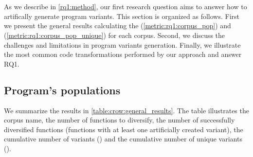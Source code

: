 
\section{\rqone}
\label{results:rq1}


\newcommand{\rossetapopulationunique}{2678}
\newcommand{\rossetapopulation}{809900}
\newcommand{\diversifiedsodium}{85}
\newcommand{\diversifiedqrcode}{32}
\newcommand{\libsodiumpopulation}{4272}
\newcommand{\libsodiumpopulationunique}{3805}
\newcommand{\qrpopulation}{6369}
\newcommand{\qrpopulationunique}{3314}


\newcommand{\allmewediversified}{\diversifiedsodium + \diversifiedqrcode}
\newcommand{\allmewepopulation}{\libpopulation + \qrpopulation}

As we describe in \autoref{rq1:method}, our first research question aims to answer how to artifically generate \wasm program variants. 
This section is organized as follows. First we present the general results calculating the \emph{\corpuspopulationsizename}(\autoref{metric:rq1:corpus_pop}) and \emph{\corpusuniquepopulationsizename}(\autoref{metric:rq1:corpus_pop_unique}) for each corpus. 
Second, we discuss the challenges and limitations in program variants generation. Finally, we illustrate the most common code transformations performed by our approach and answer RQ1.

\subsection*{Program's populations}

We summarize the results in \autoref{table:crow:general_results}.
The table illustrates the corpus name, the number of functions to diversify, the number of successfully diversified functions (functions with at least one artificially created variant), the cumulative number of variants (\emph{\corpuspopulationsizename}) and the cumulative number of unique variants (\emph{\corpusuniquepopulationsizename}).

